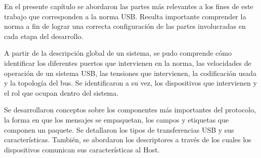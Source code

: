 En el presente capítulo se abordaron las partes más relevantes a los fines de este trabajo que corresponden a la norma USB. Resulta importante comprender la norma a fin de lograr una correcta configuración de las partes involucradas en cada etapa del desarrollo.%

A partir de la descripción global de un sistema, se pudo comprende cómo identificar los diferentes puertos que intervienen en la norma, las velocidades de operación de un sistema USB, las tensiones que intervienen, la codificación usada y la topología del bus. Se identificaron a su vez, los dispositivos que intervienen y el rol que ocupan dentro del sistema.%

Se desarrollaron conceptos sobre los componentes más importantes del protocolo, la forma en que los mensajes se empaquetan, los campos y etiquetas que componen un paquete. Se detallaron los tipos de transferencias USB y sus características. También, se abordaron los descriptores a través de los cuales los dispositivos comunican sus características al Host.